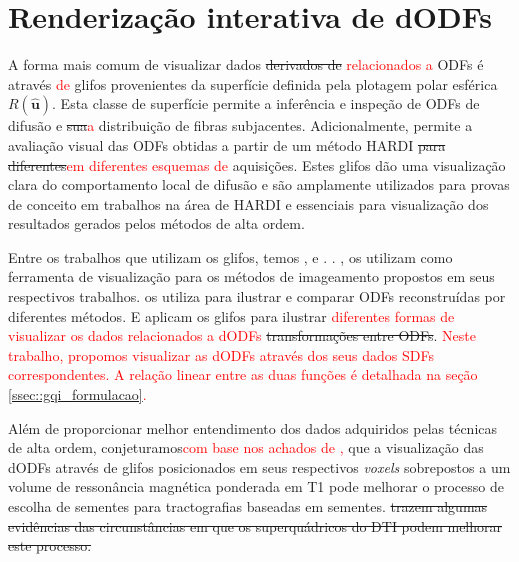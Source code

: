 \chapter{Renderização interativa de dODFs}
\label{chap::renderizacao_interativa_de_perfis_de_difusao}


A forma mais comum de visualizar dados \sout{derivados de} \textcolor{red}{relacionados a} ODFs é através \textcolor{red}{de} glifos provenientes da superfície definida pela plotagem polar esférica $R(\mathbf{\hat{u}})$. Esta classe de superfície permite a inferência e inspeção de ODFs de difusão e \sout{sua}\textcolor{red}{a} distribuição de fibras subjacentes. Adicionalmente, permite a avaliação visual das ODFs obtidas a partir de um método HARDI \sout{para diferentes}\textcolor{red}{em diferentes esquemas de} aquisições. Estes glifos dão uma visualização clara do comportamento local de difusão e são amplamente utilizados para provas de conceito em trabalhos na área de HARDI e essenciais para visualização dos resultados gerados pelos métodos de alta ordem.

Entre os trabalhos que utilizam os glifos, temos ,   e  .  . ,   os utilizam como ferramenta de visualização para os métodos de imageamento propostos em seus respectivos trabalhos.  os utiliza para ilustrar e comparar ODFs reconstruídas por diferentes métodos. E  aplicam os glifos  para ilustrar \textcolor{red}{diferentes formas de visualizar os dados relacionados a dODFs} \sout{transformações entre ODFs}. \textcolor{red}{Neste trabalho, propomos visualizar as dODFs através dos seus dados SDFs correspondentes. A relação linear entre as duas funções é detalhada na seção \ref{ssec::gqi_formulacao}.} 

Além de proporcionar melhor entendimento dos dados adquiridos pelas técnicas de alta ordem, conjeturamos\textcolor{red}{com base nos achados de ,} que a visualização das dODFs através de glifos posicionados em seus respectivos \textit{voxels} sobrepostos a um volume de ressonância magnética ponderada em T1 pode melhorar o processo de escolha de sementes para tractografias baseadas em sementes.\sout{  trazem algumas evidências das circunstâncias em que os superquádricos do DTI podem melhorar este processo.}

